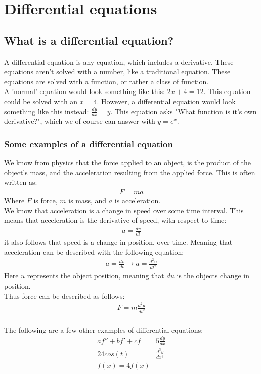 \chapter{Differential equations}

\section{What is a differential equation?}
A differential equation is any equation, which includes a derivative. These equations aren't solved with a number, like a traditional equation. These equations are solved with a function, or rather a class of function. \\
A 'normal' equation would look something like this: $2x+4=12$. This equation could be solved with an $x=4$. However, a differential equation would look something like this instead: $\frac{dy}{dx} = y$. This equation asks "What function is it's own derivative?", which we of course can answer with $y=e^x$. \\

\subsection{Some examples of a differential equation}
We know from physics that the force applied to an object, is the product of the object's mass, and the acceleration resulting from the applied force. This is often written as: 
\begin{align*}
	F=ma
\end{align*}
Where $F$ is force, $m$ is mass, and $a$ is acceleration. \\
We know that acceleration is a change in speed over some time interval. This means that acceleration is the derivative of speed, with respect to time:
\begin{align}
	a = \frac{dv}{dt}
\end{align}
it also follows that speed is a change in position, over time. Meaning that acceleration can be described with the following equation:
\begin{align*}
	a = \frac{dv}{dt} \rightarrow a = \frac{d^2u}{dt^2}
\end{align*}
Here $u$ represents the object position, meaning that $du$ is the objects change in position. \\
Thus force can be described as follows:
\begin{align}
	 F = m\frac{d^2u}{dt^2}
\end{align}
\\
The following are a few other examples of differential equations:
\begin{align}
	af''+bf'+cf =& 5\frac{dy}{dx}		\\
	24cos(t)=&\frac{d^3y}{dx^3}			\\
	f(x)=4f(x) 						
\end{align}

